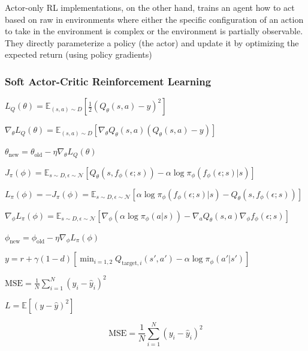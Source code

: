 \documentclass[12pt, a4paper]{report}
\begin{document}
Actor-only RL implementations, on the other hand, trains an agent how to act based on raw  in environments where either the specific configuration of an action to take in the environment is complex or the environment is partially observable.
They directly
parameterize a policy (the actor) and update it by optimizing the expected
return (using policy gradients)

\subsubsection{Soft Actor-Critic Reinforcement Learning}

$L_Q(\theta) = \mathbb{E}_{(s,a) \sim D} \left[ \frac{1}{2} \left( Q_\theta(s, a) - y \right)^2 \right]$

$\nabla_\theta L_Q(\theta) = \mathbb{E}_{(s,a) \sim D} \left[ \nabla_\theta Q_\theta(s, a) \left( Q_\theta(s, a) - y \right) \right]$

$\theta_{\text{new}} = \theta_{\text{old}} - \eta \nabla_\theta L_Q(\theta)$    

$J_\pi(\phi) = \mathbb{E}_{s \sim D, \epsilon \sim \mathcal{N}} \left[ Q_\theta(s, f_\phi(\epsilon; s)) - \alpha \log \pi_\phi(f_\phi(\epsilon; s)|s) \right]$

$L_\pi(\phi) = -J_\pi(\phi) = \mathbb{E}_{s \sim D, \epsilon \sim \mathcal{N}} \left[ \alpha \log \pi_\phi(f_\phi(\epsilon; s)|s) - Q_\theta(s, f_\phi(\epsilon; s)) \right]$

$\nabla_\phi L_\pi(\phi) = \mathbb{E}_{s \sim D, \epsilon \sim \mathcal{N}} \left[ \nabla_\phi \left( \alpha \log \pi_\phi(a|s) \right) - \nabla_a Q_\theta(s, a) \nabla_\phi f_\phi(\epsilon; s) \right]$

$\phi_{\text{new}} = \phi_{\text{old}} - \eta \nabla_\phi L_\pi(\phi)$


$y = r + \gamma (1 - d) \left[ \min_{i=1,2} Q_{\text{target}, i}(s', a') - \alpha \log \pi_\phi(a'|s') \right]$

$\text{MSE} = \frac{1}{N} \sum_{i=1}^{N} (y_i - \hat{y}_i)^2$

$L = \mathbb{E} \left[ (y - \hat{y})^2 \right]$


\begin{equation}
    \mathrm{MSE}=\frac{1}{N}\sum^N_{i=1}\left(y_i-\hat y_i\right)^2
\end{equation}
\end{document}

